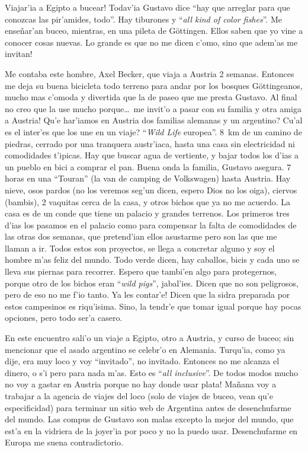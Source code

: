 \textexclamdown Viajar'ia a Egipto a bucear! Todav'ia Gustavo dice ``hay que
arreglar para que conozcas las pir'amides, todo''. Hay tiburones y ``\emph{all
kind of color fishes}''. Me ense\~nar'an buceo, mientras, en una pileta de
G\"ottingen. Ellos saben que yo vine a conocer cosas nuevas. Lo grande es que no
me dicen c'omo, \textexclamdown sino que adem'as me invitan!

Me contaba este hombre, Axel Becker, que viaja a Austria 2 semanas. Entonces me
deja su buena bicicleta todo terreno para andar por los bosques G\"ottingeanos,
mucho mas c'omoda y divertida que la de paseo que me presta Gustavo. Al final no
creo que la use mucho porque\ldots\ \textexclamdown me invit'o a pasar con su
familia y otra amiga a Austria! \textquestiondown Qu'e har'iamos en Austria dos
familias alemanas y un argentino? \textquestiondown Cu'al es el inter'es que los
une en un viaje? ``\emph{Wild Life} europea''. 8~km de un camino de piedras,
cerrado por una tranquera austr'iaca, hasta una casa sin electricidad ni
comodidades t'ipicas. Hay que buscar agua de vertiente, y bajar todos los d'ias
a un pueblo en bici a comprar el pan. Buena onda la familia, Gustavo asegura. 7
horas en una ``Touran'' (la van de camping de Volkswagen) hasta Austria. Hay
nieve, osos pardos (no los veremos seg'un dicen, espero Dios no los oiga),
ciervos (bambis), 2 vaquitas cerca de la casa, y otros bichos que ya no me
acuerdo. La casa es de un conde que tiene un palacio y grandes terrenos. Los
primeros tres d'ias los pasamos en el palacio como para compensar la falta de
comodidades de las otras dos semanas, que pretend'ian ellos asustarme pero son
las que me llaman a ir. Todos estos son proyectos, se llega a concretar alguno y
soy el hombre m'as feliz del mundo. Todo verde dicen, hay caballos, bicis y cada
uno se lleva sus piernas para recorrer. Espero que tambi'en algo para
protegernos, porque otro de los bichos eran ``\emph{wild pigs}'', jabal'ies.
Dicen que no son peligrosos, pero de eso no me f'io tanto. \textexclamdown Ya
les contar'e! Dicen que la sidra preparada por estos campesinos es riqu'isima.
Sino, la tendr'e que tomar igual porque hay pocas opciones, pero todo ser'a
casero.

En este encuentro sali'o un viaje a Egipto, otro a Austria, y curso de buceo;
sin mencionar que el asado argentino se celebr'o en Alemania. Turqu'ia, como ya
dije, era muy loco y voy ``invitado'', no invitado. Entonces no me alcanza el
dinero, o s'i pero para nada m'as. Esto es ``\emph{all inclusive}''.
\textexclamdown De todos modos mucho no voy a gastar en Austria porque no hay
donde usar plata! Ma\~nana voy a trabajar a la agencia de viajes del loco (solo
de viajes de buceo, vean qu'e especificidad) para terminar un sitio web de
Argentina antes de desenchufarme del mundo. Las compus de Gustavo son malas
excepto la mejor del mundo, que est'a en la vidriera de la joyer'ia por poco y
no la puedo usar. Desenchufarme en Europa me suena contradictorio.

